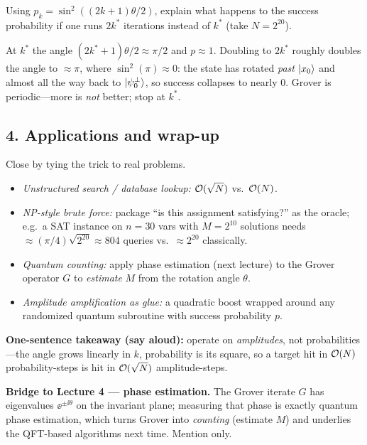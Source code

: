 \documentclass[11pt]{article}
\begin{document}
\begin{inclass}\label{ic:l3-overrotate}
Using $p_k=\sin^2((2k+1)\theta/2)$, explain what happens to the success probability
if one runs $2k^\ast$ iterations instead of $k^\ast$ (take $N=2^{20}$).
\end{inclass}
\begin{answer}
At $k^\ast$ the angle $(2k^\ast{+}1)\theta/2\approx\pi/2$ and $p\approx1$. Doubling
to $2k^\ast$ roughly doubles the angle to $\approx\pi$, where
$\sin^2(\pi)\approx0$: the state has rotated \emph{past} $\ket{x_0}$ and almost all
the way back to $\ket{\psi_0^\perp}$, so success collapses to nearly $0$. Grover is
periodic---more is \emph{not} better; stop at $k^\ast$. \checkmark
\end{answer}

\subsection*{4. Applications and wrap-up }
Close by tying the trick to real problems.
\begin{itemize}[leftmargin=1.5em,itemsep=1pt,topsep=2pt]
  \item \emph{Unstructured search / database lookup:} $\mathcal{O}(\sqrt N)$ vs.\ $\mathcal{O}(N)$.
  \item \emph{NP-style brute force:} package ``is this assignment satisfying?'' as
        the oracle; e.g.\ a SAT instance on $n=30$ vars with $M=2^{10}$ solutions
        needs $\approx(\pi/4)\sqrt{2^{20}}\approx804$ queries vs.\ $\approx2^{20}$
        classically.
  \item \emph{Quantum counting:} apply phase estimation (next lecture) to the Grover
        operator $G$ to \emph{estimate} $M$ from the rotation angle $\theta$.
  \item \emph{Amplitude amplification as glue:} a quadratic boost wrapped around any
        randomized quantum subroutine with success probability $p$.
\end{itemize}
\noindent\textbf{One-sentence takeaway (say aloud):} operate on \emph{amplitudes},
not probabilities---the angle grows linearly in $k$, probability is its square, so a
target hit in $\mathcal{O}(N)$ probability-steps is hit in $\mathcal{O}(\sqrt N)$ amplitude-steps.

\begin{advanced}
\textbf{Bridge to Lecture 4 --- phase estimation.} The Grover iterate $G$ has
eigenvalues $\ee^{\pm\ii\theta}$ on the invariant plane; measuring that phase is
exactly quantum phase estimation, which turns Grover into \emph{counting} (estimate
$M$) and underlies the QFT-based algorithms next time. Mention only.
\end{advanced}
\end{document}

